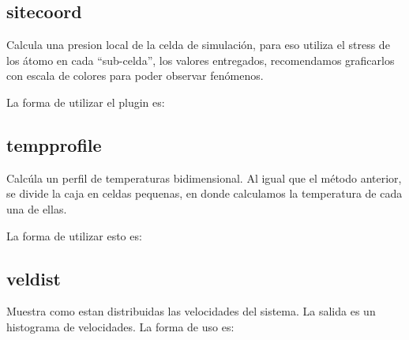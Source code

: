 \subsection{sitecoord}

Calcula una presion local de la celda de simulaci\'on, para eso utiliza el
stress de los \'atomo en cada ``sub-celda'', los valores entregados,
recomendamos graficarlos con escala de colores para poder observar fen\'omenos. 

La forma de utilizar el plugin es:


\subsection{tempprofile}
Calc\'ula un perfil de temperaturas bidimensional. Al igual que el m\'etodo
anterior, se divide la caja en celdas pequenas, en donde calculamos la
temperatura de cada una de ellas.

La forma de utilizar esto es:


\subsection{veldist}
Muestra como estan distribuidas las velocidades del sistema. La salida es un
histograma de velocidades. La forma de uso es:



